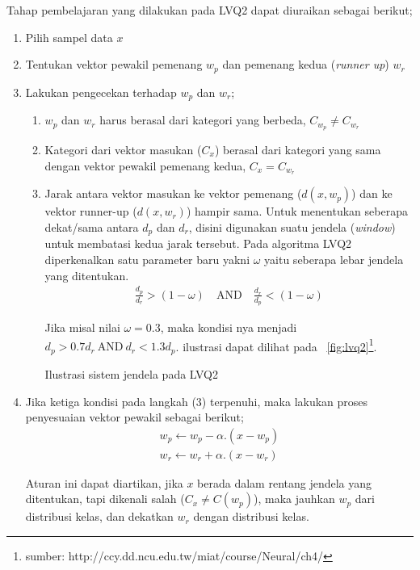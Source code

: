\noindent
Tahap pembelajaran yang dilakukan pada LVQ2 dapat diuraikan sebagai berikut;
\begin{enumerate}
  \setlength{\itemsep}{1pt}
  \setlength{\parskip}{0pt}
  \setlength{\parsep}{0pt}
  \item Pilih sampel data $x$
  \item Tentukan vektor pewakil pemenang $w_p$ dan pemenang kedua (\textit{runner
  up}) $w_r$
  \item Lakukan pengecekan terhadap $w_p$ dan $w_r$;
  \begin{enumerate}
    \item $w_p$ dan $w_r$ harus berasal dari kategori yang berbeda, $C_{w_p}
    \neq C_{w_r}$
    \item Kategori dari vektor masukan ($C_x$) berasal dari kategori yang sama
    dengan vektor pewakil pemenang kedua, $C_x = C_{w_r}$
    \item Jarak antara vektor masukan ke vektor pemenang ($d(x, w_p)$) dan
    ke vektor runner-up ($d(x, w_r)$) hampir sama. 
    Untuk menentukan seberapa dekat/sama antara $d_p$ dan $d_r$, disini
    digunakan suatu jendela (\textit{window}) untuk membatasi kedua jarak
    tersebut. Pada algoritma LVQ2 diperkenalkan satu parameter baru yakni
    $\omega$ yaitu seberapa lebar jendela yang ditentukan.
    \begin{align}
    \frac{d_p}{d_r} > (1 - \omega)\quad \text{AND}\quad \frac{d_r}{d_p} < (1 -
    \omega)
    \nonumber
    \end{align}
    
    Jika misal nilai $\omega=0.3$, maka kondisi nya menjadi $d_p > 0.7 d_r
   \ \text{AND}\ d_r < 1.3 d_p$. ilustrasi dapat dilihat pada
    \pic~\ref{fig:lvq2}\footnote{sumber:
    {http://ccy.dd.ncu.edu.tw/miat/course/Neural/ch4/}}.
    
    {Ilustrasi sistem jendela pada LVQ2} 
  \end{enumerate}
    
  \item Jika ketiga kondisi pada langkah (3) terpenuhi, maka lakukan proses
  penyesuaian vektor pewakil sebagai berikut;
  \begin{align}
  w_p \leftarrow w_p - \alpha . (x - w_p) \nonumber \\
  w_r \leftarrow w_r + \alpha . (x - w_r)
  \end{align}
  
  Aturan ini dapat diartikan, jika $x$ berada dalam rentang jendela yang
  ditentukan, tapi dikenali salah ($C_x \neq C(w_p)$), maka jauhkan $w_p$ dari
  distribusi kelas, dan dekatkan $w_r$ dengan distribusi kelas.
\end{enumerate}

